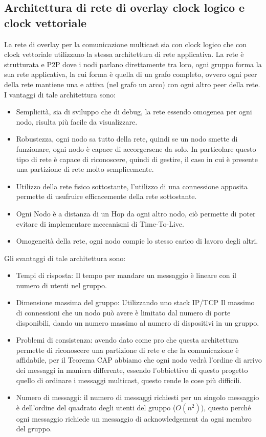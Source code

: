 \documentclass[conference]{IEEEtran}
\begin{document}
\subsection{Architettura di rete di overlay clock logico e clock vettoriale}
 La rete di overlay per la comunicazione multicast sia con clock logico che con
 clock vettoriale utilizzano la stessa architettura di rete applicativa.
 La rete è strutturata e P2P dove i nodi parlano direttamente tra loro, ogni
 gruppo forma la sua rete applicativa, la cui forma è quella di un grafo
 completo, ovvero ogni peer della rete mantiene una e attiva (nel
 grafo un arco) con ogni altro peer della rete.
 I vantaggi di tale architettura sono:
\begin{itemize}
   \item Semplicità, sia di sviluppo che di debug, la rete essendo omogenea per
     ogni nodo, risulta più facile da visualizzare.
   \item Robustezza, ogni nodo sa tutto della rete, quindi se un nodo smette di
     funzionare, ogni nodo è capace di accorgersene da solo. In particolare
     questo tipo di rete è capace di riconoscere, quindi di gestire, il caso in
     cui è presente una partizione di rete molto semplicemente.
   \item Utilizzo della rete fisico sottostante, l'utilizzo di una connessione
     apposita permette di usufruire efficacemente della rete sottostante.
   \item Ogni Nodo è a distanza di un Hop da ogni altro nodo, ciò permette di
     poter evitare di implementare meccanismi di Time-To-Live.
   \item Omogeneità della rete, ogni nodo compie lo stesso carico di lavoro
     degli altri.
 \end{itemize}
 Gli svantaggi di tale architettura sono:
 \begin{itemize}
   \item Tempi di risposta: Il tempo per mandare un messaggio è lineare con il
     numero di utenti nel gruppo.
   \item Dimensione massima del gruppo: Utilizzando uno stack IP/TCP Il massimo
     di connessioni che un nodo può avere è limitato dal numero di porte
     disponibili, dando un numero massimo al numero di dispositivi in un gruppo.
   \item Problemi di consistenza: avendo dato come pro che questa architettura
     permette di riconoscere una partizione di rete e che la comunicazione è
     affidabile, per il Teorema CAP abbiamo che ogni nodo vedrà l'ordine di
     arrivo dei messaggi in maniera differente, essendo l'obbiettivo di questo
     progetto quello di ordinare i messaggi multicast, questo rende le cose più
     difficili.
   \item Numero di messaggi: il numero di messaggi richiesti per un singolo
     messaggio è dell'ordine del quadrato degli utenti del gruppo (\(O(n^2)\)),
     questo perché ogni messaggio richiede un messaggio di acknowledgement da
     ogni membro del gruppo.
 \end{itemize}
\end{document}
